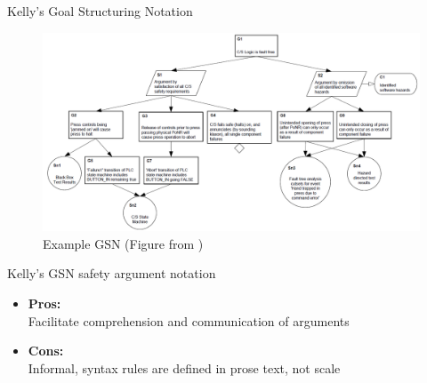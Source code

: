 \documentclass[xcolor=x11names,compress]{beamer}
\renewcommand{\(}{\begin{columns}}
\renewcommand{\)}{\end{columns}}
\newcommand{\<}[1]{\begin{column}{#1}}
\renewcommand{\>}{\end{column}}
\begin{document}

\begin{frame}{Kelly's Goal Structuring Notation}
\begin{figure}
\includegraphics[scale=0.3]{figures/gsn}
\caption{Example GSN (Figure from \cite{Kelly:GSN})}
\end{figure}
\end{frame}


\begin{frame}{Kelly's GSN safety argument notation}
\begin{itemize}
\item \textbf{Pros:} \\
	Facilitate comprehension and communication of arguments
\item \textbf{Cons:} \\
	Informal, syntax rules are defined in prose text, not scale
\end{itemize}
\end{frame}

\end{document}
